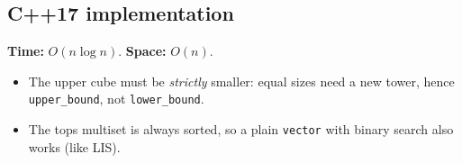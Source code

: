 
\subsection*{C++17 implementation}

\begin{complexitybox}
\textbf{Time:} $O(n\log n)$. \textbf{Space:} $O(n)$.
\end{complexitybox}

\begin{pitfallbox}
\begin{itemize}
  \item The upper cube must be \emph{strictly} smaller: equal sizes need a
        new tower, hence \texttt{upper\_bound}, not \texttt{lower\_bound}.
  \item The tops multiset is always sorted, so a plain \texttt{vector} with
        binary search also works (like LIS).
\end{itemize}
\end{pitfallbox}

